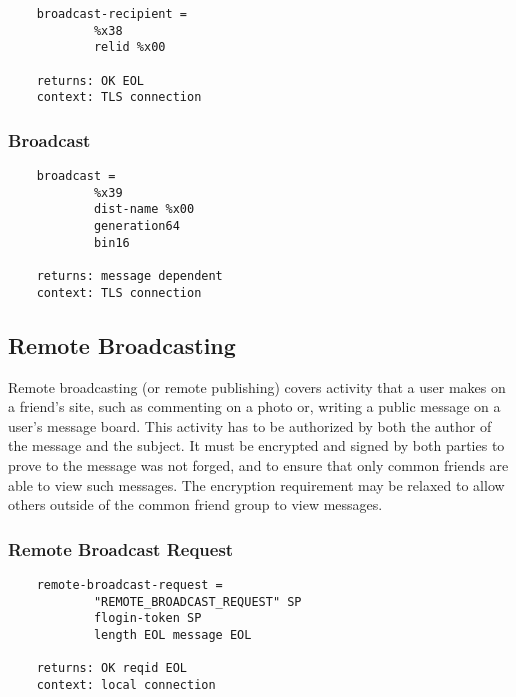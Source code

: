 \documentclass[letterpaper,11pt,oneside]{article}
\begin{document}
\vspace{10pt}
\begin{verbatim}
    broadcast-recipient = 
            %x38
            relid %x00

    returns: OK EOL
    context: TLS connection
\end{verbatim}
\vspace{10pt}


\subsubsection{Broadcast}

\vspace{10pt}
\begin{verbatim}
    broadcast = 
            %x39 
            dist-name %x00
            generation64
            bin16

    returns: message dependent
    context: TLS connection
\end{verbatim}
\vspace{10pt}

\subsection{Remote Broadcasting}

Remote broadcasting (or remote publishing) covers activity that a user makes on
a friend's site, such as commenting on a photo or, writing a public message on
a user's message board. This activity has to be authorized by both the author
of the message and the subject. It must be encrypted and signed by both parties
to prove to the message was not forged, and to ensure that only common friends
are able to view such messages. The encryption requirement may be relaxed to
allow others outside of the common friend group to view messages.

\subsubsection{Remote Broadcast Request}

\vspace{10pt}
\begin{verbatim}
    remote-broadcast-request = 
            "REMOTE_BROADCAST_REQUEST" SP
            flogin-token SP
            length EOL message EOL

    returns: OK reqid EOL
    context: local connection
\end{verbatim}
\vspace{10pt}
\end{document}
